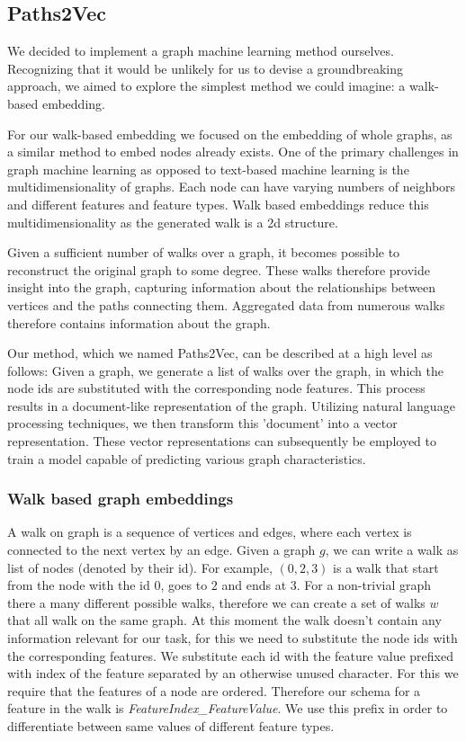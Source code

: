 \subsection{Paths2Vec}

We decided to implement a graph machine learning method ourselves. Recognizing that it would be unlikely for us to devise a groundbreaking approach, we aimed to explore the simplest method we could imagine: a walk-based embedding.

For our walk-based embedding we focused on the embedding of whole graphs, as a similar method to embed nodes already exists\cite{2016node2vec}. One of the primary challenges in graph machine learning as opposed to text-based machine learning is the multidimensionality of graphs. Each node can have varying numbers of neighbors and different features and feature types. Walk based embeddings reduce this multidimensionality as the generated walk is a 2d structure.

Given a sufficient number of walks over a graph, it becomes possible to reconstruct the original graph to some degree\cite{Wittmann2009reconstruction}. These walks therefore provide insight into the graph, capturing information about the relationships between vertices and the paths connecting them. Aggregated data from numerous walks therefore contains information about the graph.

Our method, which we named Paths2Vec, can be described at a high level as follows: Given a graph, we generate a list of walks over the graph, in which the node ids are substituted with the corresponding node features. This process results in a document-like representation of the graph. Utilizing natural language processing techniques, we then transform this 'document' into a vector representation. These vector representations can subsequently be employed to train a model capable of predicting various graph characteristics.

\subsubsection{Walk based graph embeddings}
A walk on graph is a sequence of vertices and edges, where each vertex is connected to the next vertex by an edge. Given a graph $g$, we can write a walk as list of nodes (denoted by their id). For example, $(0, 2, 3)$ is a walk that start from the node with the id $0$, goes to $2$ and ends at $3$. For a non-trivial graph there a many different possible walks, therefore we can create a set of walks $w$ that all walk on the same graph. At this moment the walk doesn't contain any information relevant for our task, for this we need to substitute the node ids with the corresponding features. We substitute each id with the feature value prefixed with index of the feature separated by an otherwise unused character. For this we require that the features of a node are ordered. Therefore our schema for a feature in the walk is \emph{FeatureIndex\_FeatureValue}. We use this prefix in order to differentiate between same values of different feature types.

